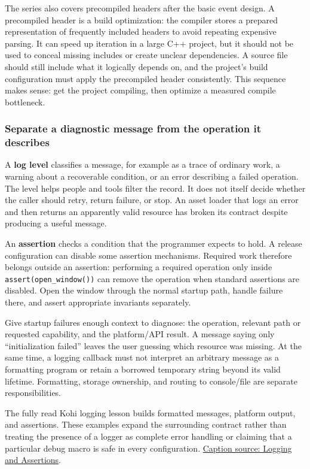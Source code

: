 The series also covers precompiled headers after the basic event design. A precompiled header is a build optimization: the compiler stores a prepared representation of frequently included headers to avoid repeating expensive parsing. It can speed up iteration in a large C++ project, but it should not be used to conceal missing includes or create unclear dependencies. A source file should still include what it logically depends on, and the project's build configuration must apply the precompiled header consistently. This sequence makes sense: get the project compiling, then optimize a measured compile bottleneck.

\subsubsection{Separate a diagnostic message from the operation it describes}\label{05-engine-i-ch013-separate-a-diagnostic-message-from-the-operation-it-describes}

A \textbf{log level} classifies a message, for example as a trace of ordinary work, a warning about a recoverable condition, or an error describing a failed operation. The level helps people and tools filter the record. It does not itself decide whether the caller should retry, return failure, or stop. An asset loader that logs an error and then returns an apparently valid resource has broken its contract despite producing a useful message.

An \textbf{assertion} checks a condition that the programmer expects to hold. A release configuration can disable some assertion mechanisms. Required work therefore belongs outside an assertion: performing a required operation only inside \texttt{assert(open\_window())} can remove the operation when standard assertions are disabled. Open the window through the normal startup path, handle failure there, and assert appropriate invariants separately.

Give startup failures enough context to diagnose: the operation, relevant path or requested capability, and the platform/API result. A message saying only ``initialization failed'' leaves the user guessing which resource was missing. At the same time, a logging callback must not interpret an arbitrary message as a formatting program or retain a borrowed temporary string beyond its valid lifetime. Formatting, storage ownership, and routing to console/file are separate responsibilities.

The fully read Kohi logging lesson builds formatted messages, platform output, and assertions. These examples expand the surrounding contract rather than treating the presence of a logger as complete error handling or claiming that a particular debug macro is safe in every configuration. \href{https://www.youtube.com/watch?v=l9e8PJskYnI}{Caption source: Logging and Assertions}.

